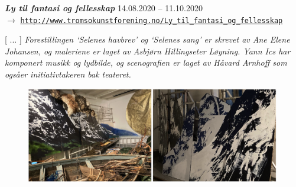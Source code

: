 \newpage 


\bigskip

\noindent \textbf{\textsl{Ly til fantasi og fellesskap}} 14.08.2020 -- 11.10.2020 \vspace{1mm} \\ 
$\rightarrow$ \href{http://www.tromsokunstforening.no/default.asp?cmd=100&UtsID=200}{\texttt{\footnotesize http://www.tromsokunstforening.no/Ly\_til\_fantasi\_og\_fellesskap}} 

\bigskip

[ ... ] \textsl{Forestillingen `Selenes havbrev' og `Selenes sang' er skrevet av Ane Elene Johansen, og maleriene er laget av Asbj\o{}rn Hillingseter L\o{}yning. Yann Ics har komponert musikk og lydbilde, og scenografien er laget av H\aa vard Arnhoff som ogs\aa  er initiativtakeren bak teateret.}

\smallskip

\begin{figure}[h]
	\begin{center}
		\includegraphics[width=0.99\textwidth]{mp/img/img2}
		\label{sh}
	\end{center}
\end{figure}

